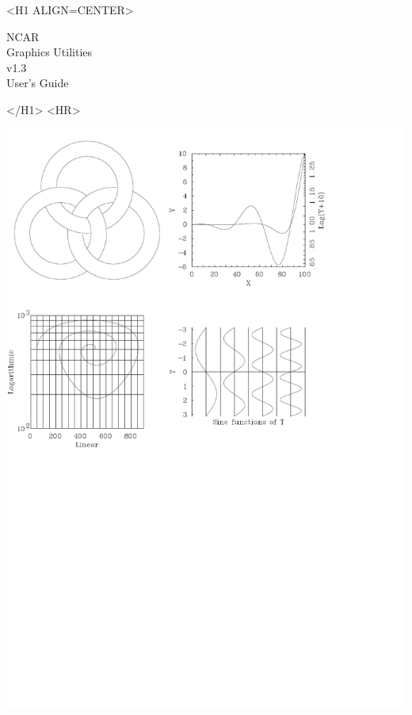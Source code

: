 \documentclass[twoside,11pt]{article}
\newcommand{\stardoctitle}     {NCAR \\ [1ex] Graphics Utilities}
\newcommand{\stardocversion}   {v1.3}
\newcommand{\stardocmanual}    {User's Guide}
\newenvironment{latexonly}{}{}
\newcommand{\xlabel}[1]{}
\renewcommand{\_}{\texttt{\symbol{95}}}
\begin{document}
\begin{latexonly}
\end{latexonly}

\begin{htmlonly}
   \xlabel{}
   \begin{rawhtml} <H1 ALIGN=CENTER> \end{rawhtml}
      \stardoctitle\\
      \stardocversion\\
      \stardocmanual
   \begin{rawhtml} </H1> <HR> \end{rawhtml}

\includegraphics[viewport=0 360 450 800,scale=0.8,clip]{sun88_cover}


\end{htmlonly}
\end{document}
